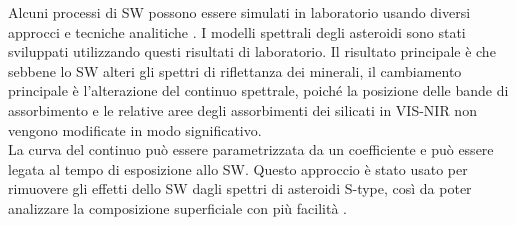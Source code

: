 Alcuni processi di SW possono essere simulati in laboratorio usando diversi approcci e tecniche analitiche \citep{bennett_space-weathering_2013}. I modelli spettrali degli asteroidi sono stati sviluppati utilizzando questi risultati di laboratorio. Il risultato principale è che sebbene lo SW alteri gli spettri di riflettanza dei minerali, il cambiamento principale è l'alterazione del continuo spettrale, poiché la posizione delle bande di assorbimento e le relative aree degli assorbimenti dei silicati in VIS-NIR non vengono modificate in modo significativo.\\
La curva del continuo può essere parametrizzata da un coefficiente e può essere legata al tempo di esposizione allo SW. Questo approccio è stato usato per rimuovere gli effetti dello SW dagli spettri di asteroidi S-type, così da poter analizzare la composizione superficiale con più facilità \citep{BRUNETTO2006327, popescu_modelling_2012}.



